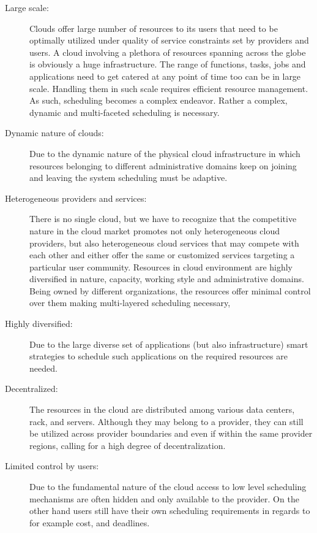 \documentclass[final,5p,times,twocolumn]{elsarticle}
\begin{document}
\begin{description}

\item [Large scale:] Clouds offer large number of resources to its
  users that need to be optimally utilized under quality of service
  constraints set by providers and users. A cloud involving a plethora
  of resources spanning across the globe is obviously a huge
  infrastructure. The range of functions, tasks, jobs and applications
  need to get catered at any point of time too can be in large scale.
  Handling them in such scale requires efficient resource management.
  As such, scheduling becomes a complex endeavor. Rather a complex,
  dynamic and multi-faceted scheduling is necessary.
            
\item [Dynamic nature of clouds:] Due to the dynamic nature of the
  physical cloud infrastructure in which resources belonging to
  different administrative domains keep on joining and leaving the
  system scheduling must be adaptive.

\item[Heterogeneous providers and services:] There is no single cloud,
  but we have to recognize that the competitive nature in the cloud
  market promotes not only heterogeneous cloud providers, but also
  heterogeneous cloud services that may compete with each other and
  either offer the same or customized services targeting a particular
  user community. Resources in cloud environment are highly
  diversified in nature, capacity, working style and administrative
  domains. Being owned by different organizations, the resources offer
  minimal control over them making multi-layered scheduling necessary,

\item [Highly diversified:] Due to the large diverse set of
  applications (but also infrastructure) smart strategies to schedule
  such applications on the required resources are needed.

\item [Decentralized:] The resources in the cloud are distributed
  among various data centers, rack, and servers. Although they may
  belong to a provider, they can still be utilized across provider
  boundaries and even if within the same provider regions, calling for
  a high degree of decentralization.

\item[Limited control by users:] Due to the fundamental nature of the
  cloud access to low level scheduling mechanisms are often hidden and
  only available to the provider. On the other hand users still have
  their own scheduling requirements in regards to for example cost,
  and deadlines.
  

\end{description}
\end{document}
